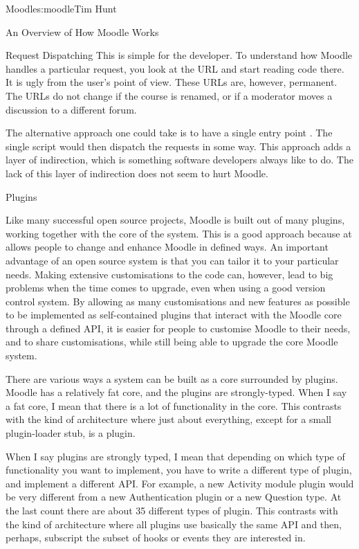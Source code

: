 \begin{aosachapter}{Moodle}{s:moodle}{Tim Hunt}
\begin{aosasect1}{An Overview of How Moodle Works}
\begin{aosasect2}{Request Dispatching}
This is simple for the developer. To understand
how Moodle handles a particular request, you look at the URL and start
reading code there. It is ugly from the user's point of view. These
URLs are, however, permanent. The URLs do not change if the course is
renamed, or if a moderator moves a discussion to a different forum.

The alternative approach one could take is to have a single entry
point 
. The single script  would then dispatch
the requests in some way. This approach adds a layer of indirection,
which is something software developers always like to do. The lack of
this layer of indirection does not seem to hurt Moodle.

\end{aosasect2}

\begin{aosasect2}{Plugins}

Like many successful open source projects, Moodle is built out of many
plugins, working together with the core of the system. This is a good
approach because at allows people to change and enhance Moodle in
defined ways. An important advantage of an open source system is that
you can tailor it to your particular needs. Making extensive
customisations to the code can, however, lead to big problems when the
time comes to upgrade, even when using a good version control
system. By allowing as many customisations and new features as
possible to be implemented as self-contained plugins that interact
with the Moodle core through a defined API, it is easier for people to
customise Moodle to their needs, and to share customisations, while
still being able to upgrade the core Moodle system.

There are various ways a system can be built as a core surrounded by
plugins. Moodle has a relatively fat core, and the plugins are
strongly-typed. When I say a fat core, I mean that there is a lot of
functionality in the core. This contrasts with the kind of architecture
where just about everything, except for a small plugin-loader stub, is
a plugin.

When I say plugins are strongly typed, I mean that depending on which
type of functionality you want to implement, you have to write a
different type of plugin, and implement a different API. For example,
a new Activity module plugin would be very different from a new
Authentication plugin or a new Question type. At the last count there
are about 35 different types of plugin. This contrasts with the kind
of architecture where all plugins use basically the same API and then,
perhaps, subscript the subset of hooks or events they are
interested in.


\end{aosasect2}
\end{aosasect1}
\end{aosachapter}
